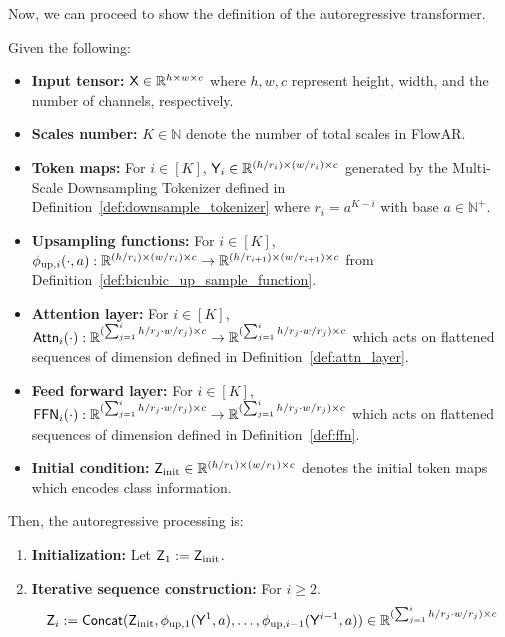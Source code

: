 Now, we can proceed to show the definition of the autoregressive transformer.
\begin{definition}\label{def:ar_transformer}
    Given the following:
    \begin{itemize}
        \item {\bf Input tensor:} $\mathsf{X} \in \mathbb{R}^{h \times w \times c}$ where $h,w,c$ represent height, width, and the number of channels, respectively.
        \item {\bf Scales number:} $K \in \mathbb{N}$ denote the number of total scales in FlowAR.
        \item {\bf Token maps:} For $i \in [K]$, $\mathsf{Y}_i \in \mathbb{R}^{(h/r_i) \times (w/r_i) \times c}$ generated by the Multi-Scale Downsampling Tokenizer defined in Definition~\ref{def:downsample_tokenizer} where $r_i = a^{K-i}$ with base $a \in \mathbb{N}^+$.
        \item {\bf Upsampling functions:}  For $i \in [K]$, $\phi_{\mathrm{up},i}(\cdot,a): \mathbb{R}^{(h/r_i) \times (w/r_i) \times c}\to \mathbb{R}^{(h/r_{i+1}) \times (w/r_{i+1}) \times c}$ from Definition~\ref{def:bicubic_up_sample_function}.
        \item {\bf Attention layer:}  For $i \in [K]$, $\mathsf{Attn}_i(\cdot):\mathbb{R}^{(\sum_{j=1}^i h/r_j \cdot w/r_{j})\times c} \to \mathbb{R}^{(\sum_{j=1}^i h/r_j \cdot w/r_{j})\times c}$ which acts on flattened sequences of dimension defined in Definition~\ref{def:attn_layer}.
        \item {\bf Feed forward layer: } For $i \in [K]$, $\mathsf{FFN}_i(\cdot): \mathbb{R}^{(\sum_{j=1}^i h/r_j \cdot w/r_{j})\times c} \to \mathbb{R}^{(\sum_{j=1}^i h/r_j \cdot w/r_{j})\times c}$ which acts on flattened sequences of dimension defined in Definition~\ref{def:ffn}.
        \item {\bf Initial condition:} $\mathsf{Z}_{\mathrm{init}} \in \mathbb{R}^{(h/r_1) \times (w/r_1) \times c}$ denotes the initial token maps which encodes class information.
    \end{itemize}
    Then, the autoregressive processing is:
    \begin{enumerate}
        \item {\bf Initialization: } Let $\mathsf{Z}_1:=\mathsf{Z}_{\mathrm{init}}$.
        \item {\bf Iterative sequence construction:} For $i \geq 2$.
        \begin{align*}
            \Z_i := \mathsf{Concat}(\mathsf{Z}_{\mathrm{init}}, \phi_{\mathrm{up}, 1}(\Y^1, a), \ldots, \phi_{\mathrm{up}, i-1}(\Y^{i-1}, a)) \in \R^{(\sum_{j=1}^i h/r_j \cdot w/r_{j})\times c}

\end{align*}
\end{enumerate}
\end{definition}

